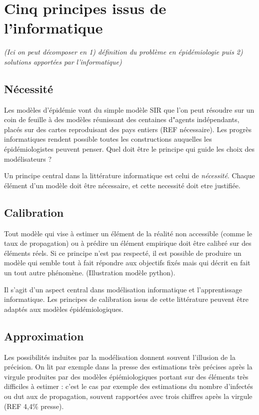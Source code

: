 \documentclass[review]{elsarticle}
\begin{document}
\section{Cinq principes issus de l'informatique}

\textit{(Ici on peut décomposer en 1) définition du problème en épidémiologie puis 2) solutions apportées par l'informatique)}

\subsection{Nécessité}

Les modèles d'épidémie vont du simple modèle SIR que l'on peut résoudre sur un coin de feuille à des modèles réunissant des centaines d"agents indépendants, placés sur des cartes reproduisant des pays entiers (REF nécessaire). Les progrès informatiques rendent possible toutes les constructions auquelles les épidémiologistes peuvent penser. Quel doit être le principe qui guide les choix des modélisateurs ? 

Un principe central dans la littérature informatique est celui de \textit{nécessité}. Chaque élément d'un modèle doit être nécessaire, et cette necessité doit etre justifiée.

\subsection{Calibration}

Tout modèle qui vise à estimer un élément de la réalité non accessible (comme le taux de propagation) ou à prédire un élément empirique doit être calibré sur des éléments réels. Si ce principe n'est pas respecté, il est possible de produire un modèle qui semble tout à fait répondre aux objectifs fixés mais qui décrit en fait un tout autre phénomène. (Illustration modèle python).

Il s'agit d'un aspect central dans modélisation informatique et l'apprentissage informatique. Les principes de calibration issus de cette littérature peuvent être adaptés aux modèles épidémiologiques.

\subsection{Approximation}

Les possibilités induites par la modélisation donnent souvent l'illusion de la précision. On lit par exemple dans la presse des estimations très précises après la virgule produites par des modèles épiémiologiques portant sur des éléments très difficiles à estimer : c'est le cas par exemple des estimations du nombre d'infectés ou dut aux de propagation, souvent rapportées avec trois chiffres après la virgule (REF 4,4\% presse). 
\end{document}
